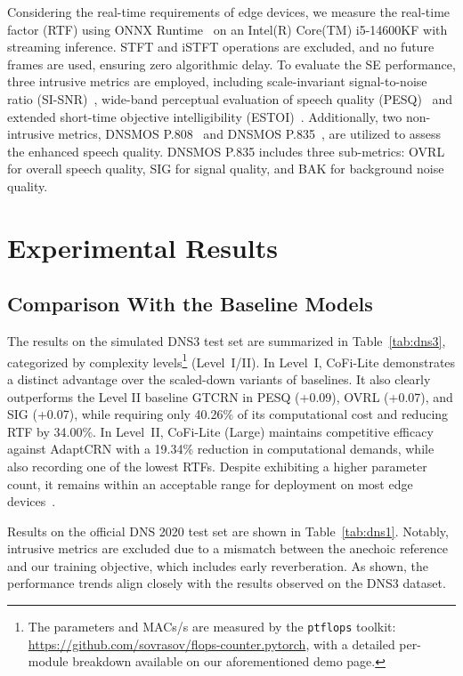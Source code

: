 \documentclass[journal]{IEEEtran}
\begin{document}
Considering the real-time requirements of edge devices, we measure the real-time factor (RTF) using ONNX Runtime~\cite{onnxruntime} on an Intel(R) Core(TM) i5-14600KF with streaming inference. STFT and iSTFT operations are excluded, and no future frames are used, ensuring zero algorithmic delay.
To evaluate the SE performance, three intrusive metrics are employed, including scale-invariant signal-to-noise ratio (SI-SNR)~\cite{sisnr}, wide-band perceptual evaluation of speech quality (PESQ)~\cite{pesq} and extended short-time objective intelligibility (ESTOI)~\cite{estoi}. 
Additionally, two non-intrusive metrics, DNSMOS P.808~\cite{p808} and DNSMOS P.835~\cite{p835}, are utilized to assess the enhanced speech quality. DNSMOS P.835 includes three sub-metrics: OVRL for overall speech quality, SIG for signal quality, and BAK for background noise quality.

\section{Experimental Results}

\subsection{Comparison With the Baseline Models}
The results on the simulated DNS3 test set are summarized in Table~\ref{tab:dns3}, categorized by complexity levels\footnote{The parameters and MACs/s are measured by the \texttt{ptflops} toolkit: \url{https://github.com/sovrasov/flops-counter.pytorch}, with a detailed per-module breakdown available on our aforementioned demo page.} (Level~I/II).
In Level~I, CoFi-Lite demonstrates a distinct advantage over the scaled-down variants of baselines.
It also clearly outperforms the Level II baseline GTCRN in PESQ (+0.09), OVRL (+0.07), and SIG (+0.07), while requiring only 40.26\% of its computational cost and reducing RTF by 34.00\%.
In Level~II, CoFi-Lite (Large) maintains competitive efficacy against AdaptCRN with a 19.34\% reduction in computational demands, while also recording one of the lowest RTFs.
Despite exhibiting a higher parameter count, it remains within an acceptable range for deployment on most edge devices~\cite{tgru}.

Results on the official DNS 2020 test set are shown in Table~\ref{tab:dns1}. Notably, intrusive metrics are excluded due to a mismatch between the anechoic reference and our training objective, which includes early reverberation.
As shown, the performance trends align closely with the results observed on the DNS3 dataset.
\end{document}
